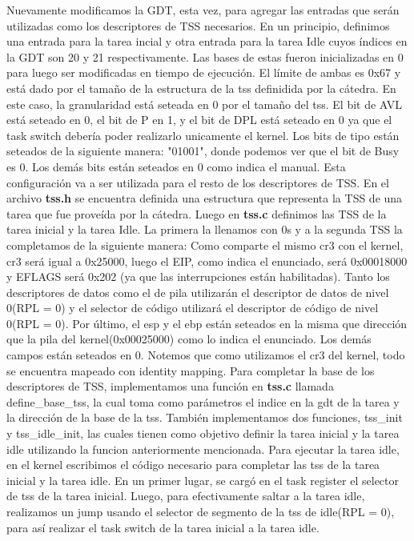 \documentclass[a4paper]{article}
\begin{document}
\justify
Nuevamente modificamos la GDT, esta vez, para agregar las entradas que serán utilizadas como los descriptores de TSS necesarios. En un principio, definimos una entrada para la tarea incial y otra entrada para la tarea Idle cuyos índices en la GDT son 20 y 21 respectivamente. Las bases de estas fueron inicializadas en 0 para luego ser modificadas en tiempo de ejecución. El límite de ambas es 0x67 y está dado por el tamaño de la estructura de la tss definidida por la cátedra. En este caso, la granularidad está seteada en 0 por el tamaño del tss. El bit de AVL está seteado en 0, el bit de P en 1, y el bit de DPL está seteado en 0 ya que el task switch debería poder realizarlo unicamente el kernel. Los bits de tipo están seteados de la siguiente manera: "01001", donde podemos ver que el bit de Busy es 0. Los demás bits están seteados en 0 como indica el manual. Esta configuración va a ser utilizada para el resto de los descriptores de TSS.
\justify
En el archivo \textbf{tss.h} se encuentra definida una estructura que representa la TSS de una tarea que fue proveída por la cátedra. Luego en \textbf{tss.c} definimos las TSS de la tarea inicial y la tarea Idle. La primera la llenamos con 0s y a la segunda TSS la completamos de la siguiente manera: Como comparte el mismo cr3 con el kernel, cr3 será igual a 0x25000, luego el EIP, como indica el enunciado, será 0x00018000 y EFLAGS será 0x202 (ya que las interrupciones están habilitadas). Tanto los descriptores de datos como el de pila utilizarán el descriptor de datos de nivel 0(RPL = 0) y el selector de código utilizará el descriptor de código de nivel 0(RPL = 0). Por último, el esp y el ebp están seteados en la misma que dirección que la pila del kernel(0x00025000) como lo indica el enunciado. Los demás campos están seteados en 0. Notemos que como utilizamos el cr3 del kernel, todo se encuentra mapeado con identity mapping.
\justify
Para completar la base de los descriptores de TSS, implementamos una función en \textbf{tss.c} llamada define_base_tss, la cual toma como parámetros el indice en la gdt de la tarea y la dirección de la base de la tss. También implementamos dos funciones, tss_init y tss_idle_init, las cuales tienen como objetivo definir la tarea inicial y la tarea idle utilizando la funcion anteriormente mencionada.
\justify
Para ejecutar la tarea idle, en el kernel escribimos el código necesario para completar las tss de la tarea inicial y la tarea idle. En un primer lugar, se cargó en el task register el selector de tss de la tarea inicial. Luego, para efectivamente saltar a la tarea idle, realizamos un jump usando el selector de segmento de la tss de idle(RPL = 0), para así realizar el task switch de la tarea inicial a la tarea idle.
\end{document}
